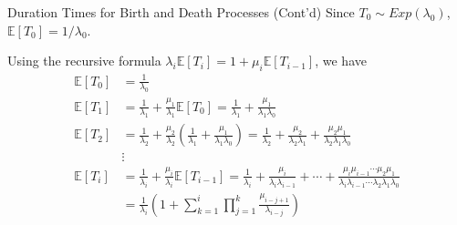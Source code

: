 \documentclass[letterpaper,handout]{beamer}
\def\E{\mathbb E}
\begin{document}
\begin{frame}{Duration Times for Birth and Death Processes (Cont'd)}
Since $T_0\sim Exp(\lambda_0)$, $\E[T_0]=1/\lambda_0$.

Using the recursive formula $\lambda_i\E[T_i]=1+\mu_i\E[T_{i-1}]$,
we have
\begin{align*}
\E[T_0]&=\frac{1}{\lambda_0}\\
\E[T_1]&=\frac{1}{\lambda_1}+\frac{\mu_1}{\lambda_1}\E[T_0]=\frac{1}{\lambda_1}+\frac{\mu_1}{\lambda_1\lambda_0}\\
\E[T_2]&=\frac{1}{\lambda_2}+\frac{\mu_2}{\lambda_2}\left(\frac{1}{\lambda_1}+\frac{\mu_1}{\lambda_1\lambda_0}\right)
=\frac{1}{\lambda_2}+\frac{\mu_2}{\lambda_2\lambda_1}+\frac{\mu_2\mu_1}{\lambda_2\lambda_1\lambda_0}\\
&\vdots\\
\E[T_i]&=\frac{1}{\lambda_i}+\frac{\mu_i}{\lambda_i}\E[T_{i-1}]
=\frac{1}{\lambda_i}+\frac{\mu_i}{\lambda_i\lambda_{i-1}}+\cdots+\frac{\mu_i\mu_{i-1}\cdots\mu_2\mu_1}{\lambda_i\lambda_{i-1}\cdots\lambda_2\lambda_1\lambda_0}\\
&=\frac{1}{\lambda_i}\left(1+\sum_{k=1}^i\prod_{j=1}^k\frac{\mu_{i-j+1}}{\lambda_{i-j}}\right)
\end{align*}
\end{frame}
\end{document}
